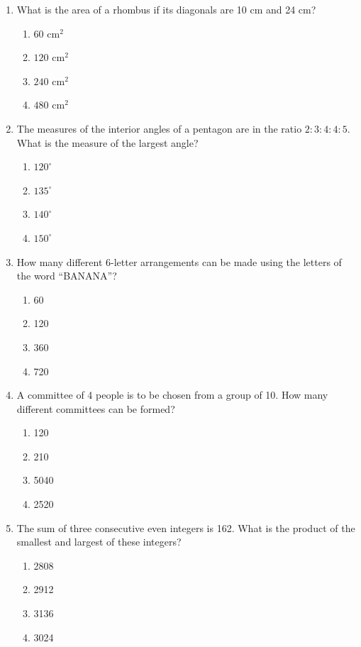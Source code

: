 \documentclass[12pt]{scrartcl}
\begin{document}
\begin{enumerate}
    \item What is the area of a rhombus if its diagonals are 10 cm and 24 cm?
    \begin{enumerate}
        \item $60\text{ cm}^2$
        \item $120\text{ cm}^2$
        \item $240\text{ cm}^2$
        \item $480\text{ cm}^2$
    \end{enumerate}

    \item The measures of the interior angles of a pentagon are in the ratio $2:3:4:4:5$. What is the measure of the largest angle?
    \begin{enumerate}
        \item $120^\circ$
        \item $135^\circ$
        \item $140^\circ$
        \item $150^\circ$
    \end{enumerate}

    \item How many different 6-letter arrangements can be made using the letters of the word ``BANANA''?
    \begin{enumerate}
        \item 60
        \item 120
        \item 360
        \item 720
    \end{enumerate}

    \item A committee of 4 people is to be chosen from a group of 10. How many different committees can be formed?
    \begin{enumerate}
        \item 120
        \item 210
        \item 5040
        \item 2520
    \end{enumerate}

    \item The sum of three consecutive even integers is 162. What is the product of the smallest and largest of these integers?
    \begin{enumerate}
        \item 2808
        \item 2912
        \item 3136
        \item 3024
    \end{enumerate}


\end{enumerate}
\end{document}
